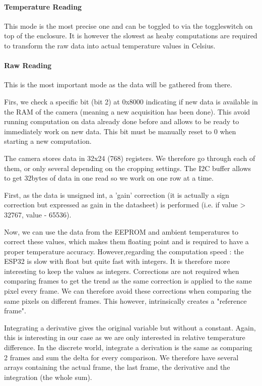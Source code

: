 \documentclass[a4paper]{article}
\begin{document}
\paragraph{Temperature Reading}
This mode is the most precise one and can be toggled to via the toggleswitch on top of the enclosure. It is however the slowest as heaby computations are required to transform the raw data into actual temperature values in Celsius.
\paragraph{Raw Reading}
This is the most important mode as the data will be gathered from there. 

Firs, we check a specific bit (bit 2) at 0x8000 indicating if new data is available in the RAM of the camera (meaning a new acquisition has been done).
This avoid running computation on data already done before and allows to be ready to immediately work on new data.
This bit must be manually reset to 0 when starting a new computation.

The camera stores data in 32x24 (768) registers. We therefore go through each of them, or only several depending on the cropping settings. The I2C buffer allows to get 32bytes of data in one read so we work on one row at a time.

First, as the data is unsigned int, a 'gain' correction (it is actually a sign correction but expressed as gain in the datasheet) is performed (i.e. if value > 32767, value - 65536).

Now, we can use the data from the EEPROM and ambient temperatures to correct these values, which makes them floating point and is required to have a proper temperature accuracy. However,regarding the computation speed : the ESP32 is slow with float but quite fast with integers. It is therefore more interesting to keep the values as integers. Corrections are not required when comparing frames to get the trend as the same correction is applied to the same pixel every frame. We can therefore avoid these corrections when comparing the same pixels on different frames. This however, intrinsically creates a "reference frame".

Integrating a derivative gives the original variable but without a constant. Again, this is interesting in our case as we are only interested in relative temperature difference.
In the discrete world, integrate a derivation is the same as comparing 2 frames and sum the delta for every comparison.
We therefore have several arrays containing the actual frame, the last frame, the derivative and the integration (the whole sum).
\end{document}
